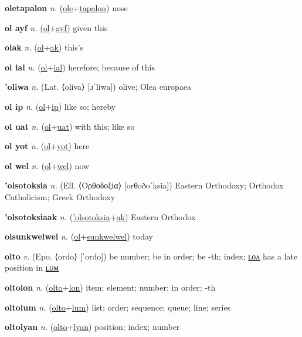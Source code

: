 \textbf{\hypertarget{oletapalon}{oletapalon}} \textit{n.} (\hyperlink{ole}{ole}+\allowbreak \hyperlink{tapalon}{tapalon})
nose

\textbf{\hypertarget{ol ayf}{ol ayf}} \textit{n.} (\hyperlink{ol}{ol}+\allowbreak \hyperlink{ayf}{ayf})
given this

\textbf{\hypertarget{olak}{olak}} \textit{n.} (\hyperlink{ol}{ol}+\allowbreak \hyperlink{ak}{ak})
this’s

\textbf{\hypertarget{ol ial}{ol ial}} \textit{n.} (\hyperlink{ol}{ol}+\allowbreak \hyperlink{ial}{ial})
herefore; because of this

\textbf{\hypertarget{'oliwa}{'oliwa}} \textit{n.} (Lat. ⟨oliva⟩ [ɔˈliwa])
olive; Olea europaea

\textbf{\hypertarget{ol ip}{ol ip}} \textit{n.} (\hyperlink{ol}{ol}+\allowbreak \hyperlink{ip}{ip})
like so; hereby

\textbf{\hypertarget{ol uat}{ol uat}} \textit{n.} (\hyperlink{ol}{ol}+\allowbreak \hyperlink{uat}{uat})
with this; like so

\textbf{\hypertarget{ol yot}{ol yot}} \textit{n.} (\hyperlink{ol}{ol}+\allowbreak \hyperlink{yot}{yot})
here

\textbf{\hypertarget{ol wel}{ol wel}} \textit{n.} (\hyperlink{ol}{ol}+\allowbreak \hyperlink{wel}{wel})
now

\textbf{\hypertarget{'olsotoksia}{'olsotoksia}} \textit{n.} (Ell. ⟨Ορθοδοξία⟩ [orθoðoˈksia])
Eastern Orthodoxy; Orthodox Catholicism; Greek Orthodoxy

\textbf{\hypertarget{'olsotoksiaak}{'olsotoksiaak}} \textit{n.} (\hyperlink{'olsotoksia}{'olsotoksia}+\allowbreak \hyperlink{ak}{ak})
Eastern Orthodox

\textbf{\hypertarget{olsunkwelwel}{olsunkwelwel}} \textit{n.} (\hyperlink{ol}{ol}+\allowbreak \hyperlink{sunkwelwel}{sunkwelwel})
today

\textbf{\hypertarget{olto}{olto}} \textit{v.} (Epo. ⟨ordo⟩ [ˈordo])
be number; be in order; be -th; index; \hyperlink{oltolon}{ʟᴏᴧ} has a late position in \hyperlink{oltolum}{ʟᴜᴍ}

\textbf{\hypertarget{oltolon}{oltolon}} \textit{n.} (\hyperlink{olto}{olto}+\allowbreak \hyperlink{lon}{lon})
item; element; number; in order; -th

\textbf{\hypertarget{oltolum}{oltolum}} \textit{n.} (\hyperlink{olto}{olto}+\allowbreak \hyperlink{lum}{lum})
list; order; sequence; queue; line; series

\textbf{\hypertarget{oltolyan}{oltolyan}} \textit{n.} (\hyperlink{olto}{olto}+\allowbreak \hyperlink{lyan}{lyan})
position; index; number

